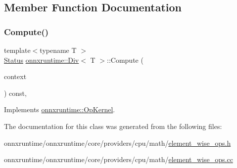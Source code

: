 \subsection{Member Function Documentation}
\mbox{\label{classonnxruntime_1_1Div_aa3b1fcb3e9f72563db651efe31573d0a}} 
\subsubsection{\texorpdfstring{Compute()}{Compute()}}
{\footnotesize\ttfamily template$<$typename T $>$ \\
\mbox{\hyperlink{classonnxruntime_1_1common_1_1Status}{Status}} \mbox{\hyperlink{classonnxruntime_1_1Div}{onnxruntime\+::\+Div}}$<$ T $>$\+::Compute (\begin{DoxyParamCaption}\item[{\mbox{\hyperlink{classonnxruntime_1_1OpKernelContext}{Op\+Kernel\+Context}} $\ast$}]{context }\end{DoxyParamCaption}) const\hspace{0.3cm}{\ttfamily [override]}, {\ttfamily [virtual]}}



Implements \mbox{\hyperlink{classonnxruntime_1_1OpKernel_a9eca8656a78b1b3ab9d3351a12798650}{onnxruntime\+::\+Op\+Kernel}}.



The documentation for this class was generated from the following files\+:\begin{DoxyCompactItemize}
\item 
onnxruntime/onnxruntime/core/providers/cpu/math/\mbox{\hyperlink{element__wise__ops_8h}{element\+\_\+wise\+\_\+ops.\+h}}\item 
onnxruntime/onnxruntime/core/providers/cpu/math/\mbox{\hyperlink{element__wise__ops_8cc}{element\+\_\+wise\+\_\+ops.\+cc}}\end{DoxyCompactItemize}
